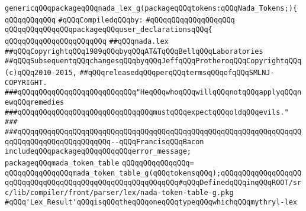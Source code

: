 \label{src/lib/compiler/front/parser/lex/nada.lex.pkg}
\verb|genericqQQqpackageqQQqnada_lex_g(packageqQQqtokens:qQQqNada_Tokens;){|\newline
\verb|qQQqqQQqqQQq|\newline
\verb|#qQQqCompiledqQQqby:|\newline
\verb|#qQQqqQQqqQQqqQQqqQQq|\newline
\newline
\verb|qQQqqQQqqQQqqQQqpackageqQQquser_declarationsqQQq{|\newline
\verb|qQQqqQQqqQQqqQQqqQQqqQQq|\newline
\verb|##qQQqnada.lex|\newline
\verb|##qQQqCopyrightqQQq1989qQQqbyqQQqAT&TqQQqBellqQQqLaboratories|\newline
\verb|##qQQqSubsequentqQQqchangesqQQqbyqQQqJeffqQQqProtheroqQQqCopyrightqQQq(c)qQQq2010-2015,|\newline
\verb|##qQQqreleasedqQQqperqQQqtermsqQQqofqQQqSMLNJ-COPYRIGHT.|\newline
\newline
\newline
\newline
\verb|###qQQqqQQqqQQqqQQqqQQqqQQqqQQq"HeqQQqwhoqQQqwillqQQqnotqQQqapplyqQQqnewqQQqremedies|\newline
\verb|###qQQqqQQqqQQqqQQqqQQqqQQqqQQqqQQqmustqQQqexpectqQQqoldqQQqevils."|\newline
\verb|###|\newline
\verb|###qQQqqQQqqQQqqQQqqQQqqQQqqQQqqQQqqQQqqQQqqQQqqQQqqQQqqQQqqQQqqQQqqQQqqQQqqQQqqQQqqQQqqQQqqQQq--qQQqFrancisqQQqBacon|\newline
\newline
\newline
\verb|includeqQQqpackageqQQqqQQqqQQqerror_message;|\newline
\newline
\verb|packageqQQqmada_token_table|\newline
\verb|qQQqqQQqqQQqqQQq=|\newline
\verb|qQQqqQQqqQQqqQQqmada_token_table_g(qQQqtokensqQQq);qQQqqQQqqQQqqQQqqQQqqQQqqQQqqQQqqQQqqQQqqQQqqQQqqQQqqQQqqQQq#qQQqDefinedqQQqinqQQqROOT/src/lib/compiler/front/parser/lex/nada-token-table-g.pkg|\newline
\newline
\verb|#qQQq'Lex_Result'qQQqisqQQqtheqQQqoneqQQqtypeqQQqwhichqQQqmythryl-lex|\newline
